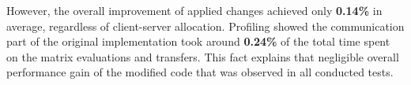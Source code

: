 However, the overall improvement of applied changes achieved only \textbf{0.14\%} in average, regardless of client-server allocation. Profiling showed the communication part of the original implementation took around \textbf{0.24\%} of the total time spent on the matrix evaluations and transfers. This fact explains that negligible overall performance gain of the modified code that was observed in all conducted tests.\\